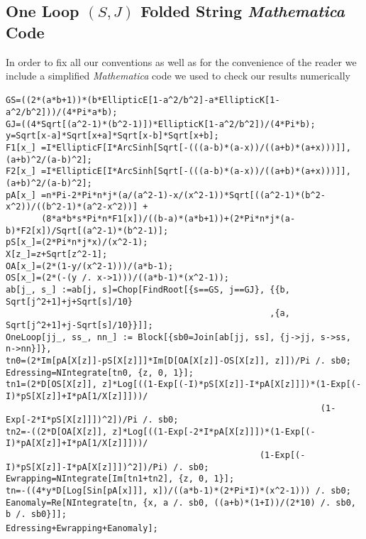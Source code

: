 \subsection{One Loop $(S,J)$ Folded String {\it Mathematica} {Code}}
In order to fix all our conventions as well as for the convenience of the
reader we include a simplified  {\it Mathematica} {code}
we used to check our results numerically\\
{\footnotesize
\verb" "\\
\verb"GS=((2*(a*b+1))*(b*EllipticE[1-a^2/b^2]-a*EllipticK[1-a^2/b^2]))/(4*Pi*a*b);"\\
\verb"GJ=((4*Sqrt[(a^2-1)*(b^2-1)])*EllipticK[1-a^2/b^2])/(4*Pi*b);"\\
\verb"y=Sqrt[x-a]*Sqrt[x+a]*Sqrt[x-b]*Sqrt[x+b];"\\
\verb"F1[x_] =I*EllipticF[I*ArcSinh[Sqrt[-(((a-b)*(a-x))/((a+b)*(a+x)))]], (a+b)^2/(a-b)^2];"\\
\verb"F2[x_] =I*EllipticE[I*ArcSinh[Sqrt[-(((a-b)*(a-x))/((a+b)*(a+x)))]], (a+b)^2/(a-b)^2];"\\
\verb"pA[x_] =n*Pi-2*Pi*n*j*(a/(a^2-1)-x/(x^2-1))*Sqrt[((a^2-1)*(b^2-x^2))/((b^2-1)*(a^2-x^2))] +"\\
\verb"       (8*a*b*s*Pi*n*F1[x])/((b-a)*(a*b+1))+(2*Pi*n*j*(a-b)*F2[x])/Sqrt[(a^2-1)*(b^2-1)];"\\
\verb"pS[x_]=(2*Pi*n*j*x)/(x^2-1);"\\
\verb"X[z_]=z+Sqrt[z^2-1];"\\
\verb"OA[x_]=(2*(1-y/(x^2-1)))/(a*b-1);"\\
\verb"OS[x_]=(2*(-(y /. x->1)))/((a*b-1)*(x^2-1));"\\
\verb"ab[j_, s_] :=ab[j, s]=Chop[FindRoot[{s==GS, j==GJ}, {{b, Sqrt[j^2+1]+j+Sqrt[s]/10}"\\
\verb"                                                    ,{a, Sqrt[j^2+1]+j-Sqrt[s]/10}}]];"\\
\verb"OneLoop[jj_, ss_, nn_] := Block[{sb0=Join[ab[jj, ss], {j->jj, s->ss, n->nn}]},"\\
\verb"tn0=(2*Im[pA[X[z]]-pS[X[z]]]*Im[D[OA[X[z]]-OS[X[z]], z]])/Pi /. sb0;"\\
\verb"Edressing=NIntegrate[tn0, {z, 0, 1}];"\\
\verb"tn1=(2*D[OS[X[z]], z]*Log[((1-Exp[(-I)*pS[X[z]]-I*pA[X[z]]])*(1-Exp[(-I)*pS[X[z]]+I*pA[1/X[z]]]))/"\\
\verb"                                                              (1-Exp[-2*I*pS[X[z]]])^2])/Pi /. sb0;"\\
\verb"tn2=-((2*D[OA[X[z]], z]*Log[((1-Exp[-2*I*pA[X[z]]])*(1-Exp[(-I)*pA[X[z]]+I*pA[1/X[z]]]))/"\\
\verb"                                                  (1-Exp[(-I)*pS[X[z]]-I*pA[X[z]]])^2])/Pi) /. sb0;"\\
\verb"Ewrapping=NIntegrate[Im[tn1+tn2], {z, 0, 1}];"\\
\verb"tn=-((4*y*D[Log[Sin[pA[x]]], x])/((a*b-1)*(2*Pi*I)*(x^2-1))) /. sb0;"\\
\verb"Eanomaly=Re[NIntegrate[tn, {x, a /. sb0, ((a+b)*(1+I))/(2*10) /. sb0, b /. sb0}]];"\\
\verb"Edressing+Ewrapping+Eanomaly];"
\verb" "\\
}\\
